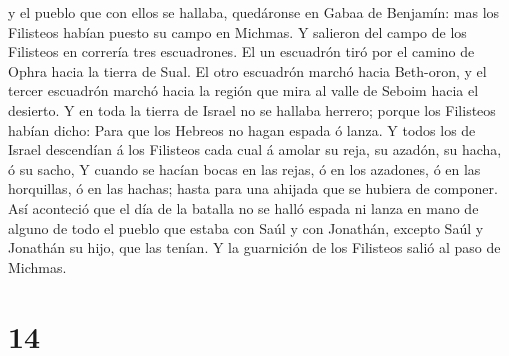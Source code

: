 y el pueblo que con ellos se hallaba, quedáronse en Gabaa de Benjamín:
mas los Filisteos habían puesto su campo en Michmas.  Y
salieron del campo de los Filisteos en correría tres escuadrones. El un
escuadrón tiró por el camino de Ophra hacia la tierra de Sual.
 El otro escuadrón marchó hacia Beth-oron, y el tercer
escuadrón marchó hacia la región que mira al valle de Seboim hacia el
desierto.  Y en toda la tierra de Israel no se hallaba
herrero; porque los Filisteos habían dicho: Para que los Hebreos no
hagan espada ó lanza.  Y todos los de Israel descendían á
los Filisteos cada cual á amolar su reja, su azadón, su hacha, ó su
sacho,  Y cuando se hacían bocas en las rejas, ó en los
azadones, ó en las horquillas, ó en las hachas; hasta para una ahijada
que se hubiera de componer.  Así aconteció que el día de
la batalla no se halló espada ni lanza en mano de alguno de todo el
pueblo que estaba con Saúl y con Jonathán, excepto Saúl y Jonathán su
hijo, que las tenían.  Y la guarnición de los Filisteos
salió al paso de Michmas.

\hypertarget{section-13}{%
\section{14}\label{section-13}}

